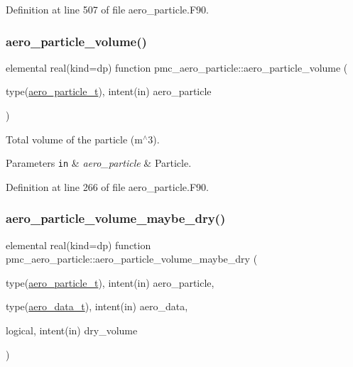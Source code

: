 Definition at line 507 of file aero\+\_\+particle.\+F90.

\mbox{\label{namespacepmc__aero__particle_a432c6796b18e1d002b7164eeba6560f0}} 
\subsubsection{\texorpdfstring{aero\+\_\+particle\+\_\+volume()}{aero\_particle\_volume()}}
{\footnotesize\ttfamily elemental real(kind=dp) function pmc\+\_\+aero\+\_\+particle\+::aero\+\_\+particle\+\_\+volume (\begin{DoxyParamCaption}\item[{type(\mbox{\hyperlink{structpmc__aero__particle_1_1aero__particle__t}{aero\+\_\+particle\+\_\+t}}), intent(in)}]{aero\+\_\+particle }\end{DoxyParamCaption})}



Total volume of the particle (m$^\wedge$3). 


\begin{DoxyParams}[1]{Parameters}
\mbox{\tt in}  & {\em aero\+\_\+particle} & Particle. \\
\hline
\end{DoxyParams}


Definition at line 266 of file aero\+\_\+particle.\+F90.

\mbox{\label{namespacepmc__aero__particle_aa07ec8ccef0daf01ab96339f823eb677}} 
\subsubsection{\texorpdfstring{aero\+\_\+particle\+\_\+volume\+\_\+maybe\+\_\+dry()}{aero\_particle\_volume\_maybe\_dry()}}
{\footnotesize\ttfamily elemental real(kind=dp) function pmc\+\_\+aero\+\_\+particle\+::aero\+\_\+particle\+\_\+volume\+\_\+maybe\+\_\+dry (\begin{DoxyParamCaption}\item[{type(\mbox{\hyperlink{structpmc__aero__particle_1_1aero__particle__t}{aero\+\_\+particle\+\_\+t}}), intent(in)}]{aero\+\_\+particle,  }\item[{type(\mbox{\hyperlink{structpmc__aero__data_1_1aero__data__t}{aero\+\_\+data\+\_\+t}}), intent(in)}]{aero\+\_\+data,  }\item[{logical, intent(in)}]{dry\+\_\+volume }\end{DoxyParamCaption})}



